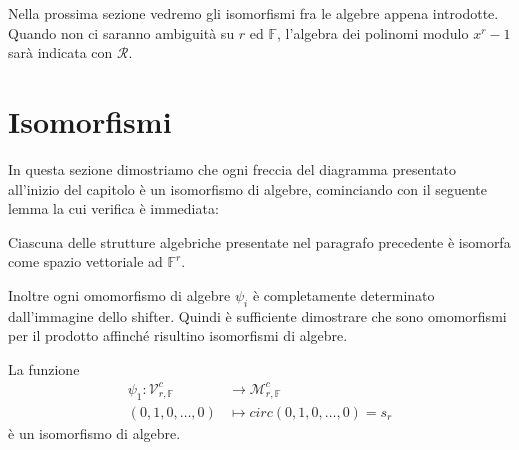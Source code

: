 Nella prossima sezione vedremo gli isomorfismi fra le algebre appena introdotte.
Quando non ci saranno ambiguità su $r$ ed $\mathbb{F}$, l'algebra dei polinomi
modulo $x^{r} -1$ sarà indicata con $\mathcal{R}$.



\section{Isomorfismi}

In questa sezione dimostriamo che ogni freccia del diagramma presentato
all'inizio del capitolo è un isomorfismo di algebre, cominciando con il seguente lemma la cui verifica è immediata:
\begin{lemmax}
Ciascuna delle strutture algebriche presentate nel paragrafo precedente è
isomorfa come spazio vettoriale ad $\mathbb{F}^r$.
\end{lemmax}
\noindent
Inoltre ogni omomorfismo di algebre $\psi_{i}$ è completamente determinato
dall'immagine dello shifter. Quindi è sufficiente dimostrare che sono
omomorfismi per il prodotto
affinché risultino isomorfismi di algebre.

\begin{prop}
La funzione
\begin{align*}
\psi_{1}: \mathcal{V}_{r, \mathbb{F}}^{c}
          &\longrightarrow
          \mathcal{M}_{r,\mathbb{F} }^{c}  \\
              (0,1,0,\dots , 0)
              &\longmapsto
              circ(0,1,0,\dots , 0) = s_{r}
\end{align*}
è un isomorfismo di algebre.
\end{prop}

